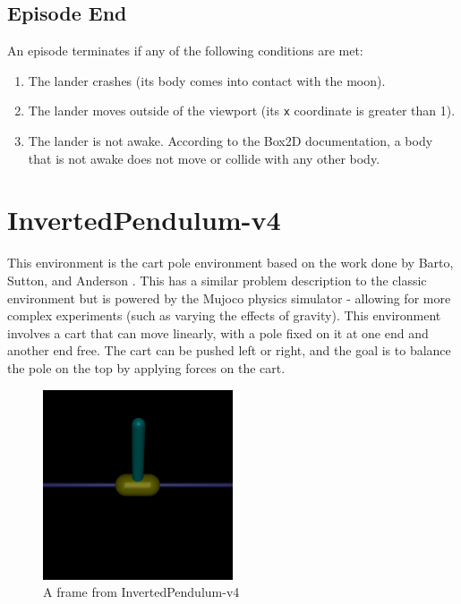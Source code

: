 \documentclass{article} %
\begin{document}
\subsection{Episode End}
An episode terminates if any of the following conditions are met: \begin{enumerate} \item The lander crashes (its body comes into contact with the moon). \item The lander moves outside of the viewport (its \verb|x| coordinate is greater than 1). \item The lander is not awake. According to the Box2D documentation, a body that is not awake does not move or collide with any other body. \end{enumerate}

\section{InvertedPendulum-v4}

This environment is the cart pole environment based on the work done by Barto, Sutton, and Anderson \cite{barto1983neuronlike}. This has a similar problem description to the classic environment but is powered by the Mujoco physics simulator - allowing for more complex experiments (such as varying the effects of gravity). This environment involves a cart that can move linearly, with a pole fixed on it at one end and another end free. The cart can be pushed left or right, and the goal is to balance the pole on the top by applying forces on the cart.

\begin{figure}[h]
    \begin{center}
        \includegraphics[width=0.5\textwidth]{inverted_pendulum.png}
    \end{center}
    \caption{A frame from InvertedPendulum-v4}
    \label{fig:invpendulum-rendering}
\end{figure}
\end{document}
